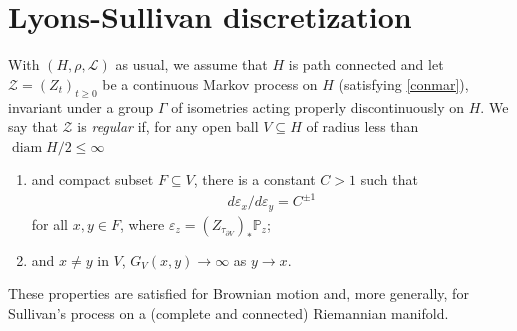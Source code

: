\documentclass[12pt,a4paper]{amsart}
\numberwithin{equation}{section}
\theoremstyle{definition}
\DeclareMathOperator{\diam}{diam}
\def\p{\mathbb P}
\def\ve{\varepsilon}
\begin{document}
\section{Lyons-Sullivan discretization}\label{secls}

With $(H,\rho,\mathcal{L})$ as usual, we assume that $H$ is path connected and let $\mathcal Z=(Z_t)_{t\ge0}$ be a continuous Markov process on $H$ (satisfying \ref{conmar}), invariant under a group $\Gamma$ of isometries acting properly discontinuously on $H$.
We say that $\mathcal{Z}$ is \emph{regular} if, for any open ball $V\subseteq H$ of radius less than $\diam H/2\le\infty$
\begin{enumerate}[label=(R\arabic*)]
\item\label{r1}
and compact subset $F\subseteq V$, there is a constant $C>1$ such that
\begin{align*}
    d\varepsilon_x/d\varepsilon_y = C^{\pm 1}
\end{align*}
for all $x,y\in F$, where $\ve_z=(Z_{\tau_{\partial V}})_{\ast}\p_z$;
\item\label{r2}
and $x\ne y$ in $V$, $G_V(x,y)\to\infty$ as $y\to x$.
\end{enumerate}
These properties are satisfied for Brownian motion and, more generally, for Sullivan's process on a (complete and connected) Riemannian manifold.

\end{document}
